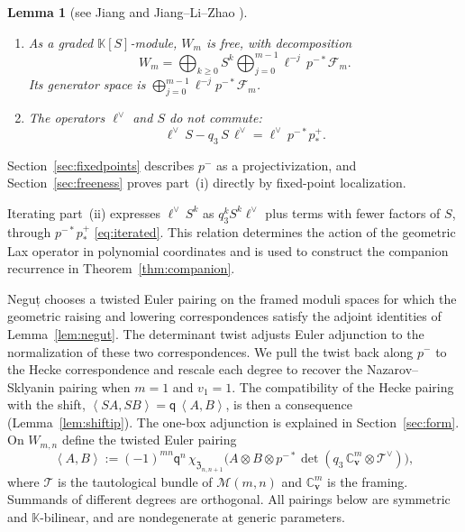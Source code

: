 \documentclass[11pt]{amsart}
\newtheorem{lemma}[theorem]{Lemma}
\theoremstyle{definition}
\theoremstyle{remark}
\newcommand{\Mq}{\mathsf q}                      %
\newcommand{\K}{\mathbb K}                       %
\newcommand{\bv}{{\mathbf v}}                    %
\newcommand{\ip}[2]{\left\langle #1,#2\right\rangle}
\newcommand{\Wdeg}[2]{W_{#1,#2}}                 %
\newcommand{\framing}{\mathbb C^m_{\bv}}         %
\newcommand{\Gies}[2]{\mathcal M(#1,#2)}         %
\newcommand{\Zc}{\mathfrak Z}
\newcommand{\Hecke}[1]{\Zc_{#1,#1+1}}            %
\newcommand{\Fock}[1]{\mathcal F_{#1}}            %
\newcommand{\Wsp}[1]{W_{#1}}                     %
\newcommand{\Tc}{\mathcal T}                     %
\newcommand{\pminus}{p^-}                        %
\newcommand{\taut}{\ell}                         %
\newcommand{\dtaut}{\taut^{\vee}}                %
\newcommand{\pulm}{p^{-*}}                       %
\newcommand{\pushp}{p^+_*}                       %
\newcommand{\Shift}{S}                           %
\newcommand{\Negut}{Neguț}
\begin{document}
\begin{lemma}[{see Jiang \cite{Jiang} and Jiang--Li--Zhao \cite{JLZ}}]\label{lem:generation}
\begin{enumerate}
\item[(i)] As a graded \(\K[\Shift]\)-module, \(\Wsp{m}\) is free, with decomposition
\[
 \Wsp{m}=\bigoplus_{k\geq0}\Shift^k\bigoplus_{j=0}^{m-1}\taut^{-j}\,\pulm\Fock{m}.
\]
Its generator space is \(\bigoplus_{j=0}^{m-1}\taut^{-j}\pulm\Fock{m}\).
\item[(ii)] The operators \(\dtaut\) and \(\Shift\) do not commute:
\[
 \dtaut\,\Shift-q_3\,\Shift\,\dtaut=\dtaut\,\pulm\pushp.
\]
\end{enumerate}
\end{lemma}

Section~\ref{sec:fixedpoints} describes \(\pminus\) as a projectivization, and
Section~\ref{sec:freeness} proves part~(i) directly by fixed-point localization.

Iterating part~(ii) expresses \(\dtaut\,\Shift^k\) as \(q_3^k\Shift^k\dtaut\) plus terms
with fewer factors of \(\Shift\), through \(\pulm\pushp\) \eqref{eq:iterated}.
This relation determines the action of the geometric Lax operator in polynomial coordinates
and is used to construct the companion recurrence in Theorem~\ref{thm:companion}.

\Negut{} \cite[(3.35), (3.39)]{N3} chooses a twisted Euler pairing on the framed moduli
spaces for which the geometric raising and lowering correspondences satisfy
the adjoint identities of Lemma~\ref{lem:negut}.
The determinant twist adjusts Euler adjunction to the normalization of these two
correspondences. We pull the twist back along \(\pminus\) to the Hecke correspondence
and rescale each degree to recover the Nazarov--Sklyanin pairing when \(m=1\) and \(v_1=1\).
The compatibility of the Hecke pairing with the shift,
\(\ip{\Shift A}{\Shift B}=\Mq\,\ip{A}{B}\), is then a consequence
(Lemma~\ref{lem:shiftip}). The one-box adjunction is explained in Section~\ref{sec:form}.
On \(\Wdeg{m}{n}\) define the twisted Euler pairing
\begin{equation}\label{eq:eulerpairing}
 \ip{A}{B}:=(-1)^{mn}\Mq^{n}\,\chi_{\Hecke{n}}\bigl(A\otimes B\otimes
 \pulm\det(q_3\,\framing\otimes\Tc^\vee)\bigr),
\end{equation}
where \(\Tc\) is the tautological bundle of \(\Gies{m}{n}\) and \(\framing\) is the framing. Summands
of different degrees are orthogonal. All pairings below are symmetric and \(\K\)-bilinear,
and are nondegenerate at generic parameters.
\end{document}
